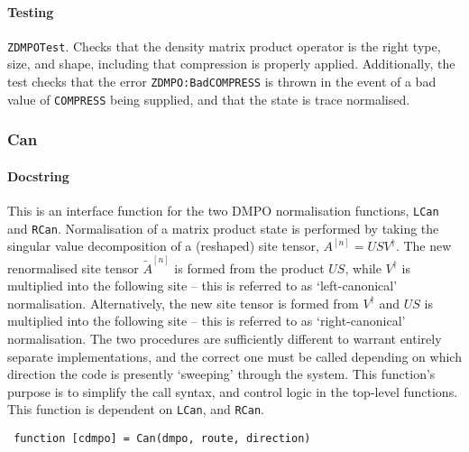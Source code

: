  \paragraph{Testing} \lstinline$ZDMPOTest$. Checks that the density matrix product operator is the right type, size, and shape, including that compression is properly applied. Additionally, the test checks that the error \lstinline$ZDMPO:BadCOMPRESS$ is thrown in the event of a bad value of \lstinline$COMPRESS$ being supplied, and that the state is trace normalised.

 \subsubsection{Can}
 \paragraph{Docstring} This is an interface function for the two DMPO normalisation functions, \lstinline$LCan$ and \lstinline$RCan$. Normalisation of a matrix product state is performed by taking the singular value decomposition of a (reshaped) site tensor, \(A^{[n]} = USV^{\dagger}\). The new renormalised site tensor \(\tilde{A}^{[n]}\) is formed from the product \(US\), while \(V^{\dagger}\) is multiplied into the following site -- this is referred to as `left-canonical' normalisation. Alternatively, the new site tensor is formed from \(V^{\dagger}\) and \(US\) is multiplied into the following site -- this is referred to as `right-canonical' normalisation. The two procedures are sufficiently different to warrant entirely separate implementations, and the correct one must be called depending on which direction the code is presently `sweeping' through the system. This function's purpose is to simplify the call syntax, and control logic in the top-level functions. This function is dependent on \lstinline$LCan$, and \lstinline$RCan$.
 \begin{lstlisting}
 function [cdmpo] = Can(dmpo, route, direction) \end{lstlisting}
